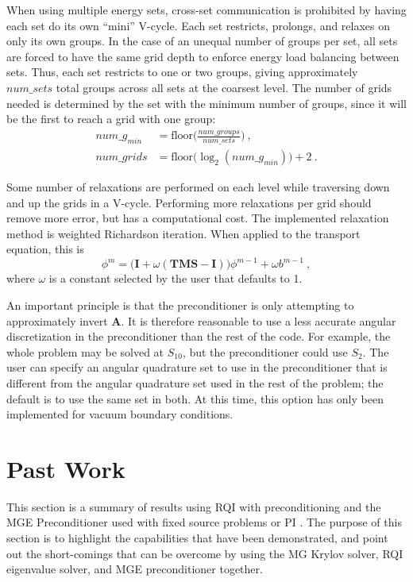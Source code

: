 \documentclass[preprint,12pt]{elsarticle}
\newcommand{\ve}[1]{\ensuremath{\mathbf{#1}}}
\begin{document}
When using multiple energy sets, cross-set communication is prohibited by having each set do its own ``mini'' V-cycle. Each set restricts, prolongs, and relaxes on only its own groups. In the case of an unequal number of groups per set, all sets are forced to have the same grid depth to enforce energy load balancing between sets. Thus, each set restricts to one or two groups, giving approximately $num\_sets$ total groups across all sets at the coarsest level. The number of grids needed is determined by the set with the minimum number of groups, since it will be the first to reach a grid with one group:%
\begin{align}
  num\_g_{min} &= \text{floor}\bigl(\frac{num\_groups}{num\_sets}\bigr) \:, \\
  num\_grids &= \text{floor}\bigl( \log_{2}(num\_g_{min}) \bigr) + 2 \:.
  \label{eq:multisetGrids}
\end{align}

Some number of relaxations are performed on each level while traversing down and up the grids in a V-cycle. Performing more relaxations per grid should remove more error, but has a computational cost. The implemented relaxation method is weighted Richardson iteration. When applied to the transport equation, this is
%
\begin{equation}
  \phi^{m} = \bigr(\ve{I} + \omega(\ve{TMS} - \ve{I})\bigl)\phi^{m-1} + \omega b^{m-1} \:,
  \label{eq:relax}
 \end{equation}
%
where $\omega$ is a constant selected by the user that defaults to 1. 

An important principle is that the preconditioner is only attempting to approximately invert $\ve{A}$. It is therefore reasonable to use a less accurate angular discretization in the preconditioner than the rest of the code. For example, the whole problem may be solved at $S_{10}$, but the preconditioner could use $S_{2}$. The user can specify an angular quadrature set to use in the preconditioner that is different from the angular quadrature set used in the rest of the problem; the default is to use the same set in both. At this time, this option has only been implemented for vacuum boundary conditions. 

\section{Past Work}
\label{sec:pastwork}
This section is a summary of results using RQI with preconditioning \cite{Slaybaugh2012} and the MGE Preconditioner used with fixed source problems or PI \cite{Slaybaugh2013}. The purpose of this section is to highlight the capabilities that have been demonstrated, and point out the short-comings that can be overcome by using the MG Krylov solver, RQI eigenvalue solver, and MGE preconditioner together.
\end{document}
